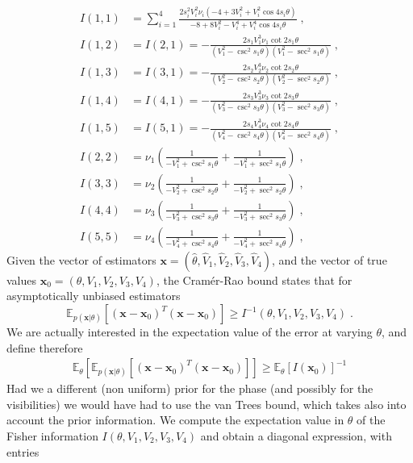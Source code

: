 \documentclass[aps, pra, 10pt, twocolumn, superscriptaddress,floatfix]{revtex4-1}
\begin{document}
\begin{align}
I(1, 1) &= \sum_{i=1}^4 \frac{2 s_i^2 V_i^2 \nu_i \left( -4 + 3 V_i^2 + V_i^2 \cos 4 s_i \theta \right)}{-8 + 8 V_i^2 -V_i^4 +V_i^4 \cos 4 s_i \theta} \; ,\\
I(1, 2) &= I(2, 1) = -\frac{2 s_1 V_1^3 \nu_1 \cot 2 s_1 \theta}{(V_1^2 - \csc ^2 s_1 \theta)(V_1^2 -\sec ^2 s_1 \theta)} \; , \\
I(1, 3) &= I(3, 1) = -\frac{2 s_2 V_2^3 \nu_2 \cot 2 s_2 \theta}{(V_2^2 - \csc ^2 s_2 \theta)(V_2^2 -\sec ^2 s_2 \theta)} \; , \\
I(1, 4) &= I(4, 1) = -\frac{2 s_3 V_3^3 \nu_3 \cot 2 s_3 \theta}{(V_3^2 - \csc ^2 s_3 \theta)(V_3^2 -\sec ^2 s_3 \theta)} \; , \\
I(1, 5) &= I(5, 1) = -\frac{2 s_4 V_4^3 \nu_4 \cot 2 s_4 \theta}{(V_4^2 - \csc ^2 s_4 \theta)(V_4^2 -\sec ^2 s_4 \theta)} \; , \\
I(2, 2) &= \nu_1 \left( \frac{1}{-V_1^2 + \csc^2 s_1 \theta} + \frac{1}{-V_1^2 + \sec^2 s_1 \theta}\right) \; ,\\
I(3, 3) &= \nu_2 \left( \frac{1}{-V_2^2 + \csc^2 s_2 \theta} + \frac{1}{-V_2^2 + \sec^2 s_2 \theta}\right) \; ,\\
I(4, 4) &= \nu_3 \left( \frac{1}{-V_3^2 + \csc^2 s_3 \theta} + \frac{1}{-V_3^2 + \sec^2 s_3 \theta}\right) \; ,\\
I(5, 5) &= \nu_4 \left( \frac{1}{-V_4^2 + \csc^2 s_4 \theta} + \frac{1}{-V_4^2 + \sec^2 s_4 \theta}\right) \; ,
\end{align}
%
Given the vector of estimators $\boldsymbol{x} = (\hat{\theta}, \hat{V}_1,  \hat{V}_2,  \hat{V}_3,  \hat{V}_4)$, and the vector of true values $\boldsymbol{x}_0 = (\theta, V_1, V_2, V_3, V_4)$, the Cramér-Rao bound states that for asymptotically unbiased estimators 
%
\begin{equation}
	 \mathbb{E}_{p(\boldsymbol{x} | \theta)} \left[ (\boldsymbol{x} - \boldsymbol{x}_0)^T  (\boldsymbol{x} - \boldsymbol{x}_0) \right] \ge I^{-1}(\theta, V_1, V_2, V_3, V_4) \; .
\end{equation}
%
We are actually interested in the expectation value of the error at varying $\theta$, and define therefore
%
\begin{eqnarray}
	\mathbb{E}_\theta \left[ \mathbb{E}_{p(\boldsymbol{x} | \theta)} \left[ (\boldsymbol{x} - \boldsymbol{x}_0)^T  (\boldsymbol{x} - \boldsymbol{x}_0) \right] \right] \ge 
	\mathbb{E}_\theta [I(\boldsymbol{x}_0)]^{-1}	 
\end{eqnarray}
%
Had we a different (non uniform) prior for the phase (and possibly for the visibilities) we would have had to use the van Trees bound, which takes also into account the prior information. We compute the expectation value in $\theta$ of the Fisher information $I(\theta, V_1, V_2, V_3, V_4)$ and obtain a diagonal expression, with entries
\end{document}
